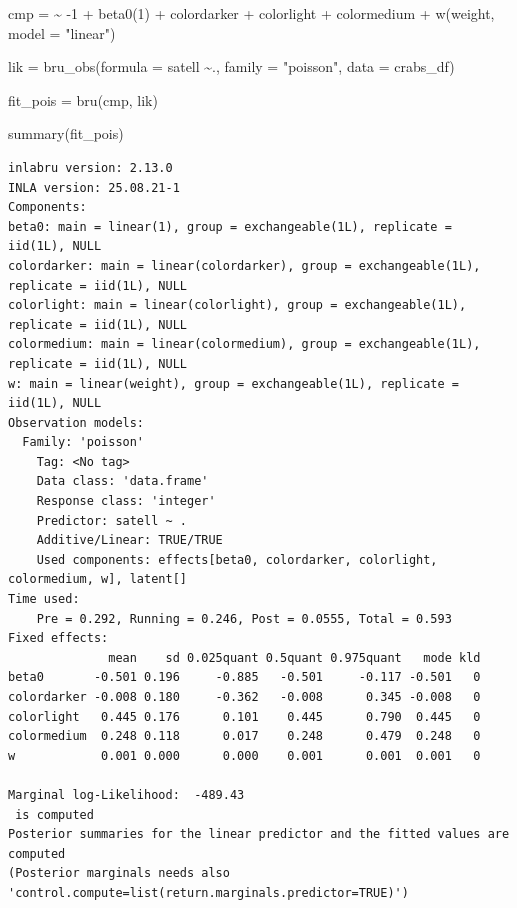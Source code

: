\documentclass[
  letterpaper,
  DIV=11,
  numbers=noendperiod]{scrartcl}
\newenvironment{Shaded}{\begin{snugshade}}{\end{snugshade}}
\newcommand{\AttributeTok}[1]{\textcolor[rgb]{0.40,0.45,0.13}{#1}}
\newcommand{\DecValTok}[1]{\textcolor[rgb]{0.68,0.00,0.00}{#1}}
\newcommand{\ErrorTok}[1]{\textcolor[rgb]{0.68,0.00,0.00}{#1}}
\newcommand{\FunctionTok}[1]{\textcolor[rgb]{0.28,0.35,0.67}{#1}}
\newcommand{\NormalTok}[1]{\textcolor[rgb]{0.00,0.23,0.31}{#1}}
\newcommand{\OtherTok}[1]{\textcolor[rgb]{0.00,0.23,0.31}{#1}}
\newcommand{\SpecialCharTok}[1]{\textcolor[rgb]{0.37,0.37,0.37}{#1}}
\newcommand{\StringTok}[1]{\textcolor[rgb]{0.13,0.47,0.30}{#1}}
\begin{document}
\begin{Shaded}
\begin{Highlighting}[]
\NormalTok{cmp }\OtherTok{=}  \ErrorTok{\textasciitilde{}} \SpecialCharTok{{-}}\DecValTok{1} \SpecialCharTok{+} \FunctionTok{beta0}\NormalTok{(}\DecValTok{1}\NormalTok{) }\SpecialCharTok{+}\NormalTok{  colordarker }\SpecialCharTok{+}
\NormalTok{       colorlight }\SpecialCharTok{+}\NormalTok{ colormedium }\SpecialCharTok{+}
       \FunctionTok{w}\NormalTok{(weight, }\AttributeTok{model =} \StringTok{"linear"}\NormalTok{)}

\NormalTok{lik }\OtherTok{=}  \FunctionTok{bru\_obs}\NormalTok{(}\AttributeTok{formula =}\NormalTok{ satell }\SpecialCharTok{\textasciitilde{}}\NormalTok{.,}
            \AttributeTok{family =} \StringTok{"poisson"}\NormalTok{,}
            \AttributeTok{data =}\NormalTok{ crabs\_df)}

\NormalTok{fit\_pois }\OtherTok{=} \FunctionTok{bru}\NormalTok{(cmp, lik)}

\FunctionTok{summary}\NormalTok{(fit\_pois)}
\end{Highlighting}
\end{Shaded}

\begin{verbatim}
inlabru version: 2.13.0
INLA version: 25.08.21-1
Components:
beta0: main = linear(1), group = exchangeable(1L), replicate = iid(1L), NULL
colordarker: main = linear(colordarker), group = exchangeable(1L), replicate = iid(1L), NULL
colorlight: main = linear(colorlight), group = exchangeable(1L), replicate = iid(1L), NULL
colormedium: main = linear(colormedium), group = exchangeable(1L), replicate = iid(1L), NULL
w: main = linear(weight), group = exchangeable(1L), replicate = iid(1L), NULL
Observation models:
  Family: 'poisson'
    Tag: <No tag>
    Data class: 'data.frame'
    Response class: 'integer'
    Predictor: satell ~ .
    Additive/Linear: TRUE/TRUE
    Used components: effects[beta0, colordarker, colorlight, colormedium, w], latent[]
Time used:
    Pre = 0.292, Running = 0.246, Post = 0.0555, Total = 0.593 
Fixed effects:
              mean    sd 0.025quant 0.5quant 0.975quant   mode kld
beta0       -0.501 0.196     -0.885   -0.501     -0.117 -0.501   0
colordarker -0.008 0.180     -0.362   -0.008      0.345 -0.008   0
colorlight   0.445 0.176      0.101    0.445      0.790  0.445   0
colormedium  0.248 0.118      0.017    0.248      0.479  0.248   0
w            0.001 0.000      0.000    0.001      0.001  0.001   0

Marginal log-Likelihood:  -489.43 
 is computed 
Posterior summaries for the linear predictor and the fitted values are computed
(Posterior marginals needs also 'control.compute=list(return.marginals.predictor=TRUE)')
\end{verbatim}
\end{document}
